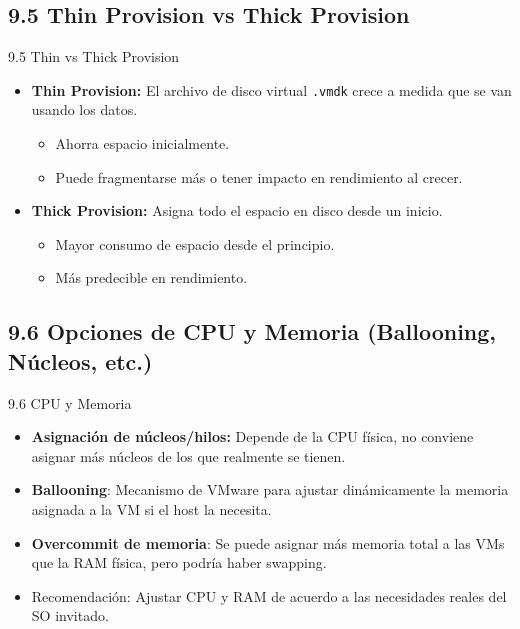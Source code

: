 \documentclass{beamer}
\begin{document}
\subsection{9.5 Thin Provision vs Thick Provision}
\begin{frame}{9.5 Thin vs Thick Provision}
    \begin{itemize}
        \item \textbf{Thin Provision:} El archivo de disco virtual \texttt{.vmdk} crece a medida que se van usando los datos.  
        \begin{itemize}
            \item Ahorra espacio inicialmente.
            \item Puede fragmentarse más o tener impacto en rendimiento al crecer.
        \end{itemize}
        \item \textbf{Thick Provision:} Asigna todo el espacio en disco desde un inicio.
        \begin{itemize}
            \item Mayor consumo de espacio desde el principio.
            \item Más predecible en rendimiento.
        \end{itemize}
    \end{itemize}
\end{frame}

\subsection{9.6 Opciones de CPU y Memoria (Ballooning, Núcleos, etc.)}
\begin{frame}{9.6 CPU y Memoria}
    \begin{itemize}
        \item \textbf{Asignación de núcleos/hilos:} Depende de la CPU física, no conviene asignar más núcleos de los que realmente se tienen.
        \item \textbf{Ballooning}: Mecanismo de VMware para ajustar dinámicamente la memoria asignada a la VM si el host la necesita.
        \item \textbf{Overcommit de memoria}: Se puede asignar más memoria total a las VMs que la RAM física, pero podría haber swapping.
        \item Recomendación: Ajustar CPU y RAM de acuerdo a las necesidades reales del SO invitado.
    \end{itemize}
\end{frame}
\end{document}

